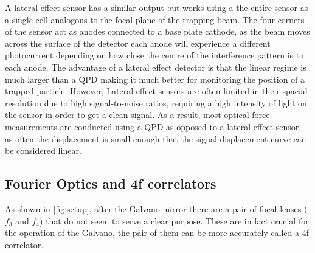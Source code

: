 A lateral-effect sensor has a similar output but works using a the 
entire sensor as a single cell analogous to the focal plane of the 
trapping beam. The four corners of the sensor act as anodes connected 
to a base plate cathode, as the beam moves across the surface of the 
detector each anode will experience a different photocurrent depending 
on how close the centre of the interference pattern is to each anode. 
The advantage of a lateral effect detector is that the linear regime 
is much larger than a QPD making it much better for monitoring the 
position of a trapped particle. However, Lateral-effect sensors are 
often limited in their spacial resolution due to high signal-to-noise 
ratios, requiring a high intensity of light on the sensor in order to 
get a clean signal. As a result, most optical force measurements are 
conducted using a QPD as opposed to a lateral-effect sensor, as often 
the displacement is small enough that the signal-displacement curve 
can be considered linear.

\subsection{Fourier Optics and 4f correlators}
\label{sec:4f_correlation}
As shown in \ref{fig:setup}, after the Galvano mirror there are a pair
of focal lenses ($f_3$ and $f_4$) that do not seem to serve a clear
purpose. These are in fact crucial for the operation of the Galvano, the
pair of them can be more accurately called a 4f correlator. 

